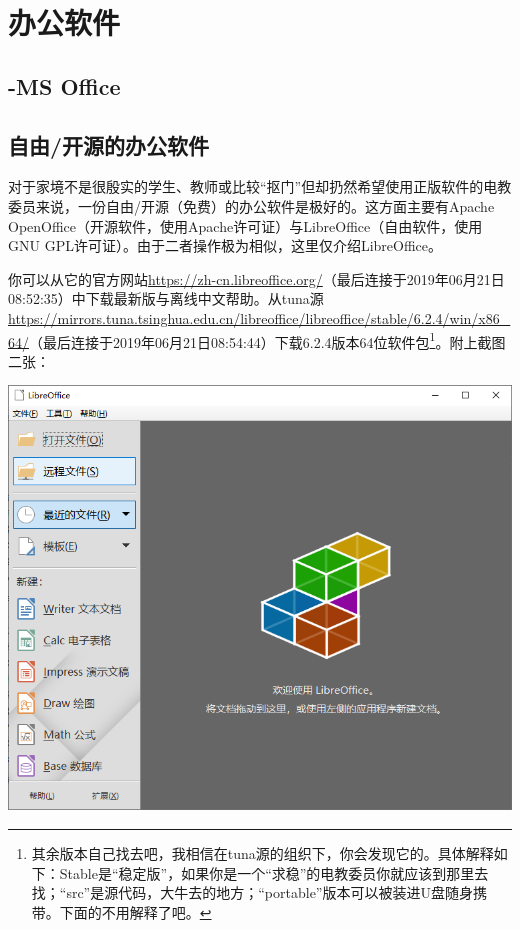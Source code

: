 \documentclass{book}
\begin{document}
\section{办公软件}
\subsection{-MS Office}
\subsection{自由/开源的办公软件}
对于家境不是很殷实的学生、教师或比较“抠门”但却扔然希望使用正版软件的电教委员来说，一份自由/开源（免费）的办公软件是极好的。这方面主要有Apache OpenOffice（开源软件，使用Apache许可证）与LibreOffice（自由软件，使用GNU GPL许可证）。由于二者操作极为相似，这里仅介绍LibreOffice。\par
你可以从它的官方网站\url{https://zh-cn.libreoffice.org/}（最后连接于2019年06月21日08:52:35）中下载最新版与离线中文帮助。从tuna源\url{https://mirrors.tuna.tsinghua.edu.cn/libreoffice/libreoffice/stable/6.2.4/win/x86_64/}（最后连接于2019年06月21日08:54:44）下载6.2.4版本64位软件包\footnote{其余版本自己找去吧，我相信在tuna源的组织下，你会发现它的。具体解释如下：Stable是“稳定版”，如果你是一个“求稳”的电教委员你就应该到那里去找；“src”是源代码，大牛去的地方；“portable”版本可以被装进U盘随身携带。下面的不用解释了吧。}。附上截图二张：
\begin{center}
	\includegraphics[scale=0.7]{pic/loffice_start}
\end{center}
\end{document}

